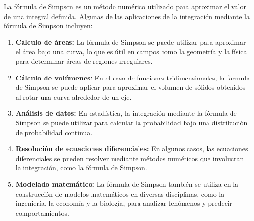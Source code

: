 La fórmula de Simpson es un método numérico utilizado para aproximar el valor de una integral definida. Algunas de las aplicaciones de la integración mediante la fórmula de Simpson incluyen:

\begin{enumerate}
	\item \textbf{Cálculo de áreas:} La fórmula de Simpson se puede utilizar para aproximar el área bajo una curva, lo que es útil en campos como la geometría y la física para determinar áreas de regiones irregulares.
	
	\item \textbf{Cálculo de volúmenes:} En el caso de funciones tridimensionales, la fórmula de Simpson se puede aplicar para aproximar el volumen de sólidos obtenidos al rotar una curva alrededor de un eje.
	
	\item \textbf{Análisis de datos:} En estadística, la integración mediante la fórmula de Simpson se puede utilizar para calcular la probabilidad bajo una distribución de probabilidad continua.
	
	\item \textbf{Resolución de ecuaciones diferenciales:} En algunos casos, las ecuaciones diferenciales se pueden resolver mediante métodos numéricos que involucran la integración, como la fórmula de Simpson.
	
	\item \textbf{Modelado matemático:} La fórmula de Simpson también se utiliza en la construcción de modelos matemáticos en diversas disciplinas, como la ingeniería, la economía y la biología, para analizar fenómenos y predecir comportamientos.
	 
\end{enumerate}


